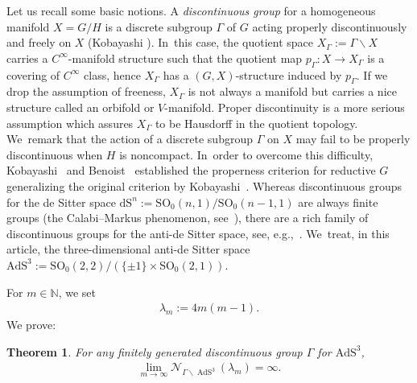\documentclass[pdftex]{sigma}
\numberwithin{equation}{section}
\newtheorem{Theorem}{Theorem}[section]
\begin{document}
Let us recall some basic notions.
A \textit{discontinuous group} for a homogeneous manifold \mbox{$X\!=\!G/H$}
is a discrete subgroup $\Gamma$ of $G$ acting properly discontinuously
and freely on $X$ (Kobayashi \cite[Definition~1.3]{Ko01}). In~this case, the quotient space $X_{\Gamma}:=\Gamma\backslash X$ carries a
$C^{\infty}$-manifold structure such that
the quotient map $p_{\Gamma}\colon X\rightarrow X_{\Gamma}$ is a covering of
$C^{\infty}$ class, hence $X_{\Gamma}$ has a $(G,X)$-structure induced by $p_{\Gamma}$.
If we drop the assumption of freeness, $X_{\Gamma}$ is not always a manifold but
carries a nice structure called an orbifold or $V$-manifold.
Proper discontinuity is a more
serious assumption which assures $X_{\Gamma}$ to be Hausdorff in the quotient topology. We~remark that the action of a discrete subgroup $\Gamma$ on $X$
may fail to be properly discontinuous
when $H$ is noncompact. In~order to overcome this difficulty,
Kobayashi~\cite{Kob96} and Benoist~\cite{Ben96} established the properness criterion
for reductive $G$ generalizing the original criterion by Kobayashi~\cite{Kob89}.
Whereas discontinuous groups for the de Sitter space
$\mathrm{dS}^{n}:=\mathrm{SO}_{0}(n,1)/\mathrm{SO}_{0}(n-1,1)$
are always finite groups
(the Calabi--Markus phenomenon, see~\cite{CaMa62, Kob89}),
there are a rich family of discontinuous groups for
the anti-de Sitter space, see, e.g.,~\cite{Go85, Kob98, Sa00}. We~treat, in this article, the three-dimensional anti-de Sitter space
$\mathrm{AdS}^{3}:=\mathrm{SO}_{0}(2,2)/(\{\pm1\}\times\mathrm{SO}_{0}(2,1))$.

For $m\in \mathbb{N}$, we set
\begin{gather*}%
\lambda_{m} := 4m(m-1).
\end{gather*}
We prove:
\begin{Theorem}
\label{mthm1}
For any finitely generated discontinuous group $\Gamma$ for
$\mathrm{AdS}^{3}$,
\begin{gather*}\lim_{m \to \infty}\mathcal{N}_{\Gamma\backslash\operatorname{AdS}^{3}}
(\lambda_{m}) = \infty.
\end{gather*}
\end{Theorem}
\end{document}
